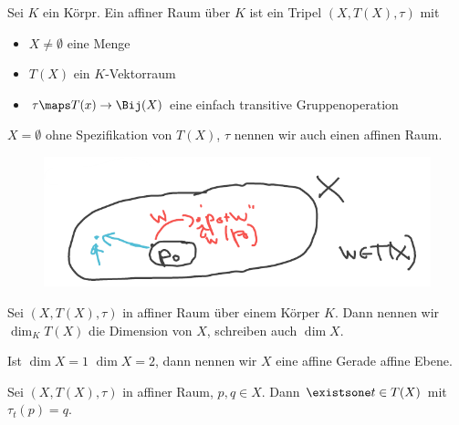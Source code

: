 \begin{definition*}
    Sei \( K \) ein Körpr. 
    Ein affiner Raum über \( K \) ist ein Tripel \( (X, T(X), \tau ) \) mit
    \begin{itemize}
        \item \( X\neq \emptyset \) eine Menge 
        \item \( T(X) \) ein \( K \)-Vektorraum 
        \item \( \tau\maps T(x)\to \Bij(X) \) eine einfach transitive Gruppenoperation
    \end{itemize}
\end{definition*}
\begin{konvention*}
    \( X=\emptyset \) ohne Spezifikation von \( T(X) \), \( \tau \) nennen wir auch einen affinen Raum.
\end{konvention*}
\begin{figure}[H]
    \centering
    \includegraphics[width=0.5\linewidth]{figures/affiner_raum}
    \label{fig:affiner_raum}
\end{figure}
\begin{definition*}
    Sei \( (X,T(X),\tau) \) in affiner Raum über einem Körper \( K \). 
    Dann nennen wir \( \dim_K T(X) \) die Dimension von \( X \), schreiben auch \( \dim X \).
     
    Ist \( \dim X=1 \) \bzw \( \dim X=2 \), dann nennen wir \( X \) eine affine Gerade \bzw affine Ebene.
\end{definition*}

Sei \( (X, T(X), \tau) \) in affiner Raum, \( p,q\in X \). Dann \( \existsone t\in T(X) \) mit \( \tau_t(p)=q \).

